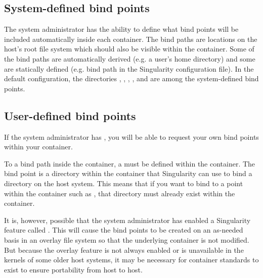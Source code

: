 \documentclass[letterpaper,10pt,english]{sphinxmanual}
\begin{document}
\subsection{System-defined bind points}
\label{\detokenize{bind_paths_and_mounts:system-defined-bind-points}}
The system administrator has the ability to define what bind points will
be included automatically inside each container. The bind paths are
locations on the host’s root file system which should also be visible
within the container. Some of the bind paths are automatically derived
(e.g. a user’s home directory) and some are statically defined (e.g.
bind path in the Singularity configuration file). In the default
configuration, the directories  ,  ,  ,  ,  and are among the system-defined
bind points.


\subsection{User-defined bind points}
\label{\detokenize{bind_paths_and_mounts:user-defined-bind-points}}
If the system administrator has , you
will be able to request your own bind points within your container.

To  a bind path inside the container, a  must be
defined within the container. The bind point is a directory within the
container that Singularity can use to bind a directory on the host
system. This means that if you want to bind to a point within the
container such as , that directory must already exist within the
container.

It is, however, possible that the system administrator has enabled a
Singularity feature called . This will cause the bind points to be created on an as-needed
basis in an overlay file system so that the underlying container is
not modified. But because the overlay feature is not always enabled or
is unavailable in the kernels of some older host systems, it may be
necessary for container standards to exist to ensure portability from
host to host.
\end{document}
